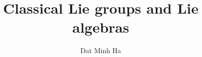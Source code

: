 

\setcounter{section}{-1}





	\title{Classical Lie groups and Lie algebras}
	
	\author{Dat Minh Ha}
	\maketitle
	
	\begin{abstract}
	    
	\end{abstract}
	
	{
      \hypersetup{} 
      \tableofcontents %
    }
    
    
    
    
    
    
	
	\printbibliography

